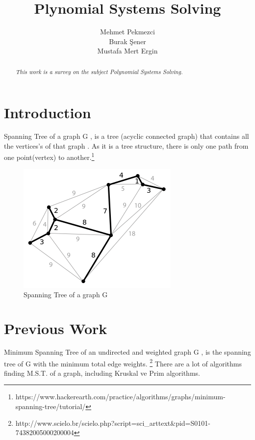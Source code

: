 \documentclass[11pt]{article}
\title{\textbf{Plynomial Systems Solving}}
\author{Mehmet Pekmezci\\
		Burak Şener\\
		Mustafa Mert Ergin
		}
\date{}
\begin{document}
\maketitle
\textbf{}

\begin{abstract}
\emph{This work is a survey on the subject Polynomial Systems Solving.}
\end{abstract}

\section{Introduction}

Spanning Tree of a graph G ,  is a tree (acyclic connected graph) that contains all the vertices's of that graph . As it is a tree structure, there is only one path from one point(vertex) to another.\footnote{https://www.hackerearth.com/practice/algorithms/graphs/minimum-spanning-tree/tutorial/}  

\begin{figure}[h!]
  \centering
  \includegraphics[width=0.4\linewidth]{spanning.png}
  \caption[Spanning Tree of a graph G ]{Spanning Tree of a graph G \footnotemark}
  \label{fig:spanningTree}
\end{figure}

\section{Previous Work}
Minimum Spanning Tree of an undirected and weighted graph G , is the spanning tree of G with the minimum  total edge weights. \footnote{http://www.scielo.br/scielo.php?script=sci\_arttext\&pid=S0101-74382005000200004} There are a lot of algorithms finding M.S.T. of a graph, including Kruskal ve Prim algorithms. 
 
\end{document}

